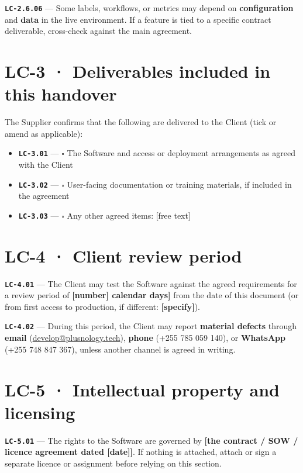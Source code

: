 \documentclass[11pt,a4paper]{article}
\newcommand{\LC}[1]{\textbf{\texttt{#1}}}
\begin{document}
\noindent\LC{LC-2.6.06} --- Some labels, workflows, or metrics may depend on \textbf{configuration} and \textbf{data} in the live environment. If a feature is tied to a specific contract deliverable, cross-check against the main agreement.

\section*{LC-3 · Deliverables included in this handover}

The Supplier confirms that the following are delivered to the Client (tick or amend as applicable):

\begin{itemize}
  \item \LC{LC-3.01} --- $\square$ The Software and access or deployment arrangements as agreed with the Client
  \item \LC{LC-3.02} --- $\square$ User-facing documentation or training materials, if included in the agreement
  \item \LC{LC-3.03} --- $\square$ Any other agreed items: [free text]
\end{itemize}

\section*{LC-4 · Client review period}

\noindent\LC{LC-4.01} --- The Client may test the Software against the agreed requirements for a review period of \textbf{[number] calendar days]} from the date of this document (or from first access to production, if different: \textbf{[specify]}).

\vspace{0.4em}
\noindent\LC{LC-4.02} --- During this period, the Client may report \textbf{material defects} through \textbf{email} (\href{mailto:develop@plusnology.tech}{develop@plusnology.tech}), \textbf{phone} (+255 785 059 140), or \textbf{WhatsApp} (+255 748 847 367), unless another channel is agreed in writing.

\section*{LC-5 · Intellectual property and licensing}

\noindent\LC{LC-5.01} --- The rights to the Software are governed by \textbf{[the contract / SOW / licence agreement dated [date]]}. If nothing is attached, attach or sign a separate licence or assignment before relying on this section.
\end{document}
